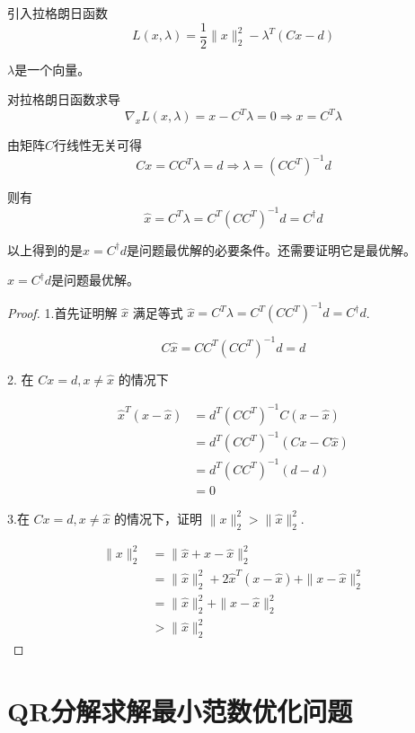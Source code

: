 引入拉格朗日函数
$$
L(x, \lambda)=\frac{1}{2}\|x\|_{2}^{2}-\lambda^{T}(C x-d)
$$

\begin{remark}
    $\lambda$是一个向量。
\end{remark}

对拉格朗日函数求导
$$
\nabla_{x} L(x, \lambda)=x-C^{T} \lambda=0 \Rightarrow x=C^{T} \lambda
$$

由矩阵$C$行线性无关可得
$$
C x=C C^{T} \lambda=d \Rightarrow \lambda=\left(C C^{T}\right)^{-1} d
$$

则有
$$
\hat{x}=C^{T} \lambda=C^{T}\left(C C^{T}\right)^{-1} d=C^{\dagger} d
$$

以上得到的是$\hat{x}=C^{\dagger} d$是问题最优解的必要条件。还需要证明它是最优解。

\begin{theorem}
    $\hat{x}=C^{\dagger} d$是问题最优解。
\end{theorem}

\begin{proof}
    1.首先证明解 $ \hat{x} $ 满足等式 $ \hat{x}=C^{T} \lambda=C^{T}\left(C C^{T}\right)^{-1} d=C^{\dagger} d $.

$$
C \hat{x}=C C^{T}\left(C C^{T}\right)^{-1} d=d
$$

2. 在 $ C x=d, x \neq \hat{x} $ 的情况下

$$
\begin{aligned}
\hat{x}^{T}(x-\hat{x}) &=d^{T}\left(C C^{T}\right)^{-1} C(x-\hat{x}) \\
&=d^{T}\left(C C^{T}\right)^{-1}(C x-C \hat{x}) \\
&=d^{T}\left(C C^{T}\right)^{-1}(d-d) \\
&=0
\end{aligned}
$$

3.在 $ C x=d, x \neq \hat{x} $ 的情况下，证明 $ \|x\|_{2}^{2}>\|\hat{x}\|_{2}^{2} $.

$$
\begin{aligned}
\|x\|_{2}^{2} &=\|\hat{x}+x-\hat{x}\|_{2}^{2} \\
&=\|\hat{x}\|_{2}^{2}+2 \hat{x}^{T}(x-\hat{x})+\|x-\hat{x}\|_{2}^{2} \\
&=\|\hat{x}\|_{2}^{2}+\|x-\hat{x}\|_{2}^{2} \\
&>\|\hat{x}\|_{2}^{2}
\end{aligned}
$$
\end{proof}

\section{QR分解求解最小范数优化问题}


